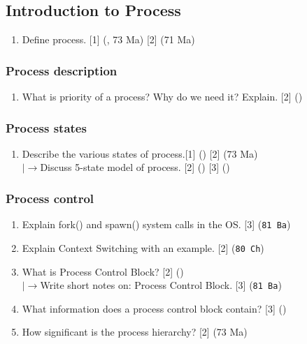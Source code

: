 \documentclass[12pt]{article}
\newcommand{\lb}{\\$\left|\rightarrow\right.$}
\begin{document}
	\subsection{Introduction to Process }
		\begin{enumerate}[noitemsep, topsep = 0pt]
			\item Define process. \hfill [1] (, 73 Ma) [2] (71 Ma)
		\end{enumerate}
	
		\subsubsection{Process description}
			\begin{enumerate}
				\item What is priority of a process? Why do we need it? Explain. \hfill [2] ()
			\end{enumerate}
		
		\subsubsection{Process states}
			\begin{enumerate}[noitemsep, topsep=0pt]
				\item Describe the various states of process.\hfill [1] () [2] (73 Ma)
				\lb Discuss 5-state model of process. \hfill [2] () [3] ()
			\end{enumerate}
		
		\subsubsection{Process control}
			\begin{enumerate}[noitemsep, topsep = 0pt]
				\item Explain fork() and spawn() system calls in the OS. \hfill [3] (\texttt{81 Ba})
				
				\item Explain Context Switching with an example. \hfill [2] (\texttt{80 Ch})
				
				\item What is Process Control Block? \hfill [2] ()
				\lb Write short notes on: Process Control Block. \hfill [3] (\texttt{81 Ba})	
				
				\item What information does a process control block contain? \hfill [3] ()
				
				\item How significant is the process hierarchy? \hfill [2] (73 Ma)
			\end{enumerate}
	
\end{document}
